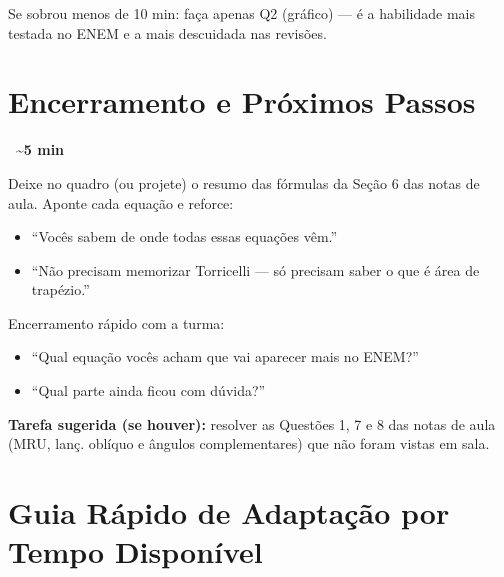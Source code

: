 \documentclass[12pt,a4paper]{article}
\newcommand{\tempo}[1]{%
  \begin{flushright}
    \colorbox{azulphysics!20}{\small\textbf{\faClock\ \textasciitilde{}#1 min}}
  \end{flushright}\vspace{-0.5em}
}
\begin{document}
\begin{tcolorbox}[cortebox]
  Se sobrou menos de 10 min: fa\c{c}a apenas Q2 (gr\'afico) --- \'e a
  habilidade mais testada no ENEM e a mais descuidada nas revis\~oes.
\end{tcolorbox}

\newpage

\section*{Encerramento e Pr\'oximos Passos}
\tempo{5}

\begin{tcolorbox}[quadrobox]
  Deixe no quadro (ou projete) o resumo das f\'ormulas da Se\c{c}\~ao 6
  das notas de aula. Aponte cada equa\c{c}\~ao e reforce:
  \begin{itemize}[nosep]
    \item ``Voc\^es sabem de onde todas essas equa\c{c}\~oes v\^em.''
    \item ``N\~ao precisam memorizar Torricelli --- s\'o precisam saber
          o que \'e \'area de trap\'ezio.''
  \end{itemize}
\end{tcolorbox}

\begin{tcolorbox}[perguntabox]
  Encerramento r\'apido com a turma:
  \begin{itemize}[nosep]
    \item ``Qual equa\c{c}\~ao voc\^es acham que vai aparecer mais no ENEM?''
    \item ``Qual parte ainda ficou com d\'uvida?''
  \end{itemize}
\end{tcolorbox}

\begin{tcolorbox}[dicabox]
  \textbf{Tarefa sugerida (se houver):} resolver as Quest\~oes 1, 7 e 8
  das notas de aula (MRU, lan\c{c}. obl\'iquo e \^angulos complementares)
  que n\~ao foram vistas em sala.
\end{tcolorbox}

\newpage

\section*{Guia R\'apido de Adapta\c{c}\~ao por Tempo Dispon\'ivel}
\end{document}
